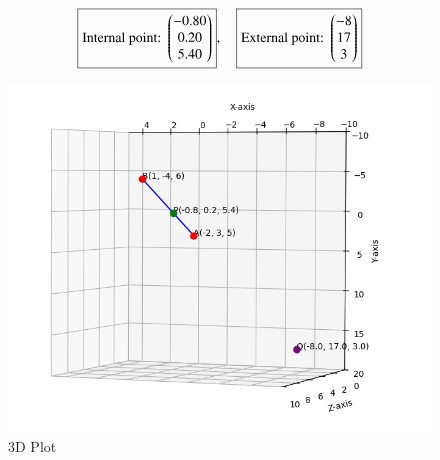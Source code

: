 \documentclass[12pt]{article}
\begin{document}
\[
\boxed{\text{Internal point: } \begin{pmatrix}-0.80 \\ 0.20 \\ 5.40\end{pmatrix}}, \quad
\boxed{\text{External point: } \begin{pmatrix}-8 \\ 17 \\ 3\end{pmatrix}}
\]
\begin{figure}
\centering
\includegraphics[width = 1.2\columnwidth]{Figs/Figure_1.png}
\caption{3D Plot}
\label{fig1:plot}
\end{figure}
\end{document}
